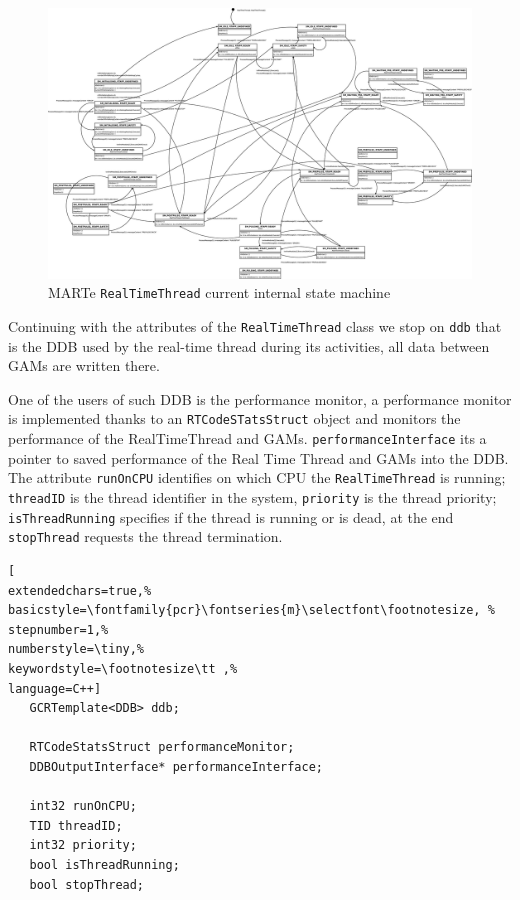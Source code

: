 \begin{figure}
 \centering
 \includegraphics[width=\textwidth]{MARTe/RealTimeThreadSM.eps}
 \caption{MARTe \texttt{RealTimeThread} current internal state machine}
 \label{f:MARTe:RealTimeThread:StateMachine}
\end{figure}
\clearpage



Continuing with the attributes of the \texttt{RealTimeThread} class we stop on \texttt{ddb} that is the DDB used by the real-time thread during its activities, all data between GAMs are written there.

One of the users of such DDB is the performance monitor, a performance monitor is implemented thanks to an \texttt{RTCodeSTatsStruct} object and monitors the performance of the RealTimeThread and GAMs. \texttt{performanceInterface} its a pointer to saved performance of the Real Time Thread and GAMs into the DDB. \\


The attribute \texttt{runOnCPU} identifies on which CPU the \texttt{RealTimeThread} is running; \texttt{threadID} is the thread identifier in the system, \texttt{priority} is the thread priority; \texttt{isThreadRunning} specifies if the thread is running or is dead, at the end \texttt{stopThread} requests the thread termination.

\begin{lstlisting}[
extendedchars=true,%
basicstyle=\fontfamily{pcr}\fontseries{m}\selectfont\footnotesize, %
stepnumber=1,%
numberstyle=\tiny,%
keywordstyle=\footnotesize\tt ,%
language=C++]
   GCRTemplate<DDB> ddb;

   RTCodeStatsStruct performanceMonitor;
   DDBOutputInterface* performanceInterface;

   int32 runOnCPU;
   TID threadID;
   int32 priority;
   bool isThreadRunning;
   bool stopThread;
\end{lstlisting}

